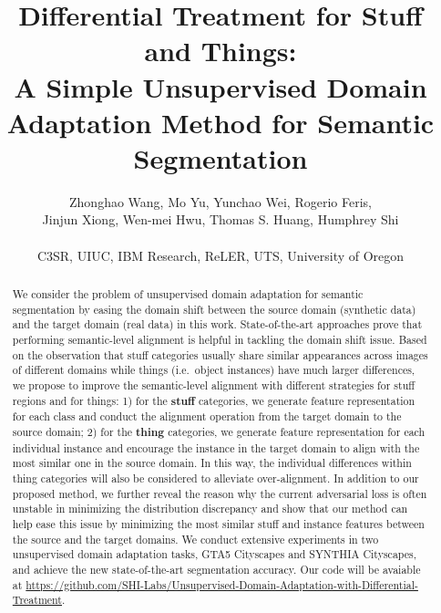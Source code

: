 \documentclass[10pt,twocolumn,letterpaper]{article}
\begin{document}
\title{ Differential Treatment for Stuff and Things: \\ A Simple Unsupervised Domain Adaptation Method for Semantic Segmentation}

\author{Zhonghao Wang, Mo Yu, Yunchao Wei, Rogerio Feris, \\
Jinjun Xiong, Wen-mei Hwu,
Thomas S. Huang, Humphrey Shi\\
\\
{\small C3SR, UIUC, IBM Research, ReLER, UTS, University of Oregon}}

\maketitle
\thispagestyle{empty}

\begin{abstract}
We consider the problem of unsupervised domain adaptation for semantic segmentation by easing the domain shift between the source domain (synthetic data) and the target domain (real data) in this work. State-of-the-art approaches prove that performing semantic-level alignment is helpful in tackling the domain shift issue. 
Based on the observation that stuff categories usually share similar appearances across images of different domains while things (i.e.\ object instances) have much larger differences, we propose to improve the semantic-level alignment with different strategies for stuff regions and for things:
1) for the \textbf{stuff} categories, we generate feature representation for each class and conduct the alignment operation from the target domain to the source domain; 2) for the \textbf{thing} categories, we generate feature representation for each individual instance and encourage the instance in the target domain to align with the most similar one in the source domain. In this way, the individual differences within thing categories will also be considered to alleviate over-alignment. In addition to our proposed method, we further reveal the reason why the current adversarial loss is often unstable in minimizing the distribution discrepancy and show that our method can help ease this issue by minimizing the most similar stuff and instance features between the source and the target domains. We conduct extensive experiments in two unsupervised domain adaptation tasks, \ie GTA5  Cityscapes and SYNTHIA  Cityscapes, and achieve the new state-of-the-art segmentation accuracy. 
Our code will be avaiable at \href{https://github.com/SHI-Labs/Unsupervised-Domain-Adaptation-with-Differential-Treatment}{https://github.com/SHI-Labs/Unsupervised-Domain-Adaptation-with-Differential-Treatment}.

\end{abstract}
\end{document}
